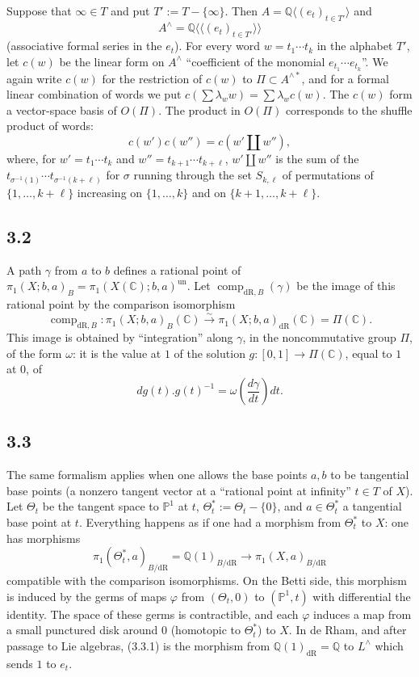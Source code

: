 \documentclass[10pt]{article}
\newcommand{\Q}{\mathbb Q}
\newcommand{\C}{\mathbb C}
\newcommand{\PP}{\mathbb P}
\newcommand{\comp}{\operatorname{comp}}
\newcommand{\dR}{\mathrm{dR}}
\newcommand{\shuffle}{\mathbin{\amalg}}
\begin{document}
Suppose that $\infty\in T$ and put $T':=T-\{\infty\}$.
Then $A=\Q\langle(e_t)_{t\in T'}\rangle$ and
\[
 A^\wedge=\Q\langle\!\langle(e_t)_{t\in T'}\rangle\!\rangle
\]
(associative formal series in the $e_t$).
For every word $w=t_1\cdots t_k$ in the alphabet $T'$, let $c(w)$ be the linear form on $A^\wedge$ ``coefficient of the monomial $e_{t_1}\cdots e_{t_k}$''.
We again write $c(w)$ for the restriction of $c(w)$ to $\Pi\subset A^{\wedge *}$, and for a formal linear combination of words we put $c(\sum\lambda_w w)=\sum\lambda_w c(w)$.
The $c(w)$ form a vector-space basis of $O(\Pi)$.
The product in $O(\Pi)$ corresponds to the shuffle product of words:
\begin{equation}
 c(w')c(w'')=c(w'\shuffle w''),
\tag{3.1.5}
\end{equation}
where, for $w'=t_1\cdots t_k$ and $w''=t_{k+1}\cdots t_{k+\ell}$, $w'\shuffle w''$ is the sum of the $t_{\sigma^{-1}(1)}\cdots t_{\sigma^{-1}(k+\ell)}$ for $\sigma$ running through the set $S_{k,\ell}$ of permutations of $\{1,\ldots,k+\ell\}$ increasing on $\{1,\ldots,k\}$ and on $\{k+1,\ldots,k+\ell\}$.

\subsection*{3.2}
A path $\gamma$ from $a$ to $b$ defines a rational point of $\pi_1(X;b,a)_B=\pi_1(X(\C);b,a)^{\mathrm{un}}$.
Let $\comp_{\dR,B}(\gamma)$ be the image of this rational point by the comparison isomorphism
\[
 \comp_{\dR,B}:\pi_1(X;b,a)_B(\C)\xrightarrow{\sim}\pi_1(X;b,a)_{\dR}(\C)=\Pi(\C).
\]
This image is obtained by ``integration'' along $\gamma$, in the noncommutative group $\Pi$, of the form $\omega$: it is the value at $1$ of the solution $g:[0,1]\to\Pi(\C)$, equal to $1$ at $0$, of
\begin{equation}
 dg(t).g(t)^{-1}=\omega\left(\frac{d\gamma}{dt}\right)dt.
\tag{3.2.1}
\end{equation}

\subsection*{3.3}
The same formalism applies when one allows the base points $a,b$ to be tangential base points (a nonzero tangent vector at a ``rational point at infinity'' $t\in T$ of $X$).
Let $\Theta_t$ be the tangent space to $\PP^1$ at $t$, $\Theta_t^*:=\Theta_t-\{0\}$, and $a\in\Theta_t^*$ a tangential base point at $t$.
Everything happens as if one had a morphism from $\Theta_t^*$ to $X$: one has morphisms
\begin{equation}
 \pi_1(\Theta_t^*,a)_{B/\dR}=\Q(1)_{B/\dR}\longrightarrow\pi_1(X,a)_{B/\dR}
\tag{3.3.1}
\end{equation}
compatible with the comparison isomorphisms.
On the Betti side, this morphism is induced by the germs of maps $\varphi$ from $(\Theta_t,0)$ to $(\PP^1,t)$ with differential the identity.
The space of these germs is contractible, and each $\varphi$ induces a map from a small punctured disk around $0$ (homotopic to $\Theta_t^*$) to $X$.
In de Rham, and after passage to Lie algebras, (3.3.1) is the morphism from $\Q(1)_{\dR}=\Q$ to $L^\wedge$ which sends $1$ to $e_t$.
\end{document}
